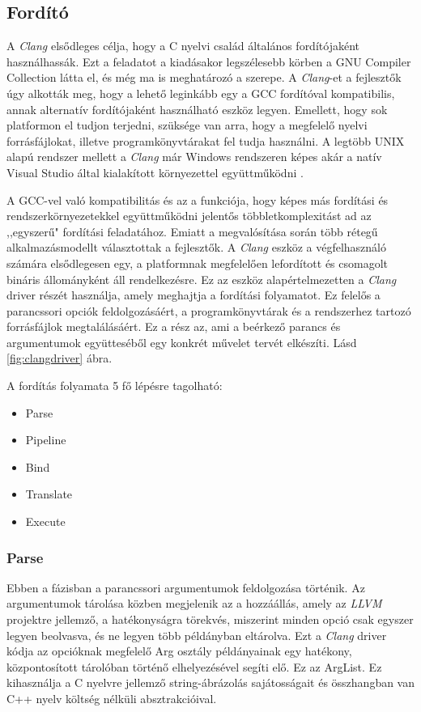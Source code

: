 \documentclass[a4paper,12pt]{report}
\begin{document}
\subsection*{Fordító}
A \emph{Clang} elsődleges célja, hogy a C nyelvi család általános fordítójaként használhassák. Ezt a feladatot a kiadásakor legszélesebb körben a GNU Compiler Collection látta el, és még ma is meghatározó a szerepe. A \emph{Clang}-et a fejlesztők úgy alkották meg, hogy a lehető leginkább egy a GCC fordítóval kompatibilis, annak alternatív fordítójaként használható eszköz legyen. Emellett, hogy sok platformon el tudjon terjedni, szüksége van arra, hogy a megfelelő nyelvi forrásfájlokat, illetve programkönyvtárakat fel tudja használni. A legtöbb UNIX alapú rendszer mellett a \emph{Clang} már Windows rendszeren képes akár a natív Visual Studio által kialakított környezettel együttműködni \cite{clangusermanual}.

A GCC-vel való kompatibilitás és az a funkciója, hogy képes más fordítási és rendszerkörnyezetekkel együttműködni jelentős többletkomplexitást ad az ,,egyszerű" fordítási feladatához. Emiatt a megvalósítása során több rétegű alkalmazásmodellt választottak a fejlesztők. A \emph{Clang} eszköz a végfelhasználó számára elsődlegesen egy, a platformnak megfelelően lefordított és csomagolt bináris állományként áll rendelkezésre. Ez az eszköz alapértelmezetten a \emph{Clang} driver részét használja, amely meghajtja a fordítási folyamatot. Ez felelős a parancssori opciók feldolgozásáért, a programkönyvtárak és a rendszerhez tartozó forrásfájlok megtalálásáért. Ez a rész az, ami a beérkező parancs és argumentumok együtteséből egy konkrét művelet tervét elkészíti. Lásd \ref{fig:clangdriver} ábra.

A fordítás folyamata 5 fő lépésre tagolható:
\begin{itemize}
\item Parse
\item Pipeline
\item Bind
\item Translate
\item Execute
\end{itemize}

\subsubsection{Parse}
Ebben a fázisban a parancssori argumentumok feldolgozása történik. Az argumentumok tárolása közben megjelenik az a hozzáállás, amely az \emph{LLVM} projektre jellemző, a hatékonyságra törekvés, miszerint minden opció csak egyszer legyen beolvasva, és ne legyen több példányban eltárolva. Ezt a \emph{Clang} driver kódja az opcióknak megfelelő Arg osztály példányainak egy hatékony, központosított tárolóban történő elhelyezésével segíti elő. Ez az ArgList. Ez kihasználja a C nyelvre jellemző string-ábrázolás sajátosságait és  összhangban van C++ nyelv költség nélküli absztrakcióival.
\end{document}
